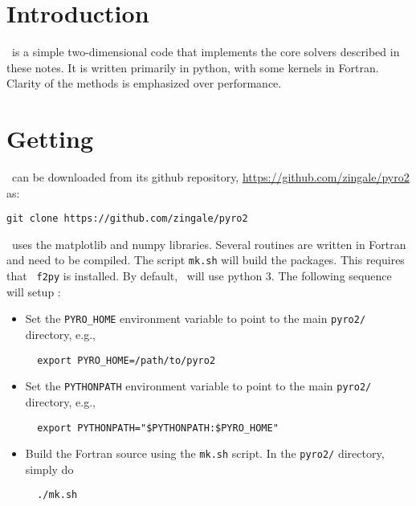 \label{app:pyro}



\section{Introduction}

\pyro\ is a simple two-dimensional code that implements the core
solvers described in these notes.  It is written primarily in python,
with some kernels in Fortran.  Clarity of the methods is emphasized
over performance.


\section{Getting \pyro}

\pyro\ can be downloaded from its github repository, \url{https://github.com/zingale/pyro2} as:
\begin{verbatim}
git clone https://github.com/zingale/pyro2
\end{verbatim}

\pyro\ uses the {\sf matplotlib} and {\sf numpy} libraries.
Several routines are written in Fortran and need to be compiled.  The
script {\tt mk.sh} will build the packages.  This requires that {\tt
f2py} is installed.  By default, \pyro\ will use python 3.  
The following sequence will setup \pyro:
\begin{itemize}
\item Set the {\tt PYRO\_HOME} environment variable to point to the
  main {\tt pyro2/} directory, e.g.,
  \begin{verbatim}
  export PYRO_HOME=/path/to/pyro2
  \end{verbatim}

\item Set the {\tt PYTHONPATH} environment variable to point to the
  main {\tt pyro2/} directory, e.g.,
  \begin{verbatim}
  export PYTHONPATH="$PYTHONPATH:$PYRO_HOME"
  \end{verbatim}

\item Build the Fortran source using the {\tt mk.sh} script.  In the
  {\tt pyro2/} directory, simply do
  \begin{verbatim}
  ./mk.sh
  \end{verbatim}
\end{itemize}




